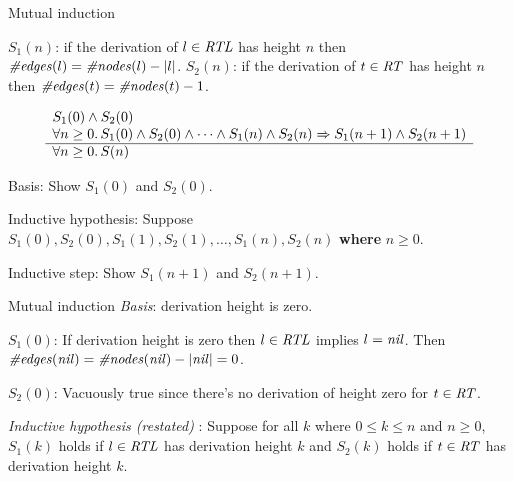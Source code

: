 \documentclass[style=sailor,size=12pt]{powerdot}
\newcommand{\id}[1]{\mbox{\it #1\/}}
\begin{document}
\begin{wideslide}[bm=,toc=]{Mutual induction}

\vspace{1em}
$S_1(n)$: if the derivation of $l\in \id{RTL}$ has height $n$ then
$\id{\#edges}(l) = \id{\#nodes}(l) - |l|$.
$S_2(n)$: if the derivation of $t\in \id{RT}$ has height $n$ then
$\id{\#edges}(t) = \id{\#nodes}(t) - 1$.

\vspace{1em}



\begin{displaymath}
\begin{array}[t]{l}
S_1(0)\wedge S_2(0) \\
\forall n\geq 0.\, S_1(0)\wedge S_2(0) \wedge \cdots \wedge
S_1(n)\wedge S_2(n)\Rightarrow S_1(n+1)\wedge S_2(n+1)\\
\hline
\forall n\geq 0.\, S(n)
\end{array}
\end{displaymath}

\vspace{1em}
Basis: Show $S_1(0)$ and $S_2(0)$.

\vspace{1em}
Inductive hypothesis: Suppose $S_1(0), S_2(0), S_1(1), S_2(1), \ldots ,S_1(n),S_2(n)$ {\bf where} $n\geq 0$.

\vspace{1em}
Inductive step: Show $S_1(n+1)$ and $S_2(n+1)$.

\end{wideslide}
\begin{wideslide}[bm=,toc=]{Mutual induction}
{\em Basis\/}: derivation height is zero.

\vspace{1em}
$S_1(0)$: If derivation height is zero then $l\in\id{RTL}$ implies $l=\id{nil}$.
Then $\id{\#edges}(\id{nil})=\id{\#nodes}(\id{nil}) - |\id{nil}| = 0$.

\vspace{1em}
$S_2(0)$: Vacuously true since there's no derivation of height zero for $t\in\id{RT}$.

\vspace{2em}
{\em Inductive hypothesis (restated)\/} :  Suppose for all $k$ where $0\leq k\leq n$ and $n\geq 0$,
$S_1(k)$ holds if $l\in\id{RTL}$ has derivation height $k$ and
$S_2(k)$ holds if $t\in\id{RT}$ has derivation height $k$.
\end{wideslide}
\end{document}
